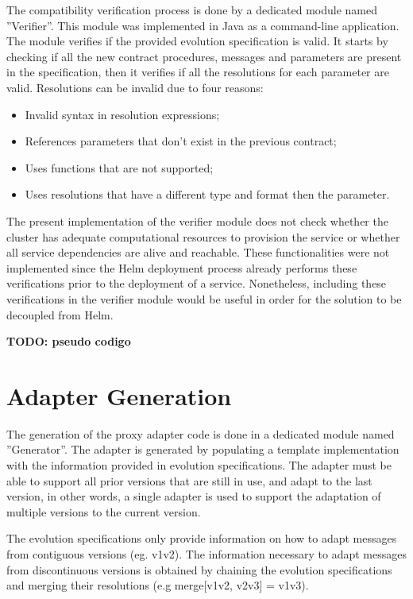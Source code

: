 The compatibility verification process is done by a dedicated module named ''Verifier''.
This module was implemented in Java as a command-line application.
The module verifies if the provided evolution specification is valid.
It starts by checking if all the new contract procedures, messages and parameters are present in the specification,
then it verifies if all the resolutions for each parameter are valid.
Resolutions can be invalid due to four reasons:

\begin{itemize}
    \setlength\itemsep{0em}
    \item Invalid syntax in resolution expressions;
    \item References parameters that don't exist in the previous contract;
    \item Uses functions that are not supported;
    \item Uses resolutions that have a different type and format then the parameter.
\end{itemize}

The present implementation of the verifier module does not check whether the cluster has adequate computational resources to provision the service or whether all service dependencies are alive and reachable.
These functionalities were not implemented since the Helm deployment process already performs these verifications prior to the deployment of a service.
Nonetheless, including these verifications in the verifier module would be useful in order for the solution to be decoupled from Helm.

\textbf{TODO: pseudo codigo}

\newpage

\section{Adapter Generation} %
\label{sec:adapter_generation}

The generation of the proxy adapter code is done in a dedicated module named ''Generator''.
The adapter is generated by populating a template implementation with the information provided in evolution specifications.
The adapter must be able to support all prior versions that are still in use, and adapt to the last version, in other words,
a single adapter is used to support the adaptation of multiple versions to the current version.

The evolution specifications only provide information on how to adapt messages from contiguous versions (eg. v1\textrightarrow v2).
The information necessary to adapt messages from discontinuous versions is obtained by chaining the evolution specifications and
merging their resolutions (e.g merge[v1\textrightarrow v2, v2\textrightarrow v3] = v1\textrightarrow v3).

